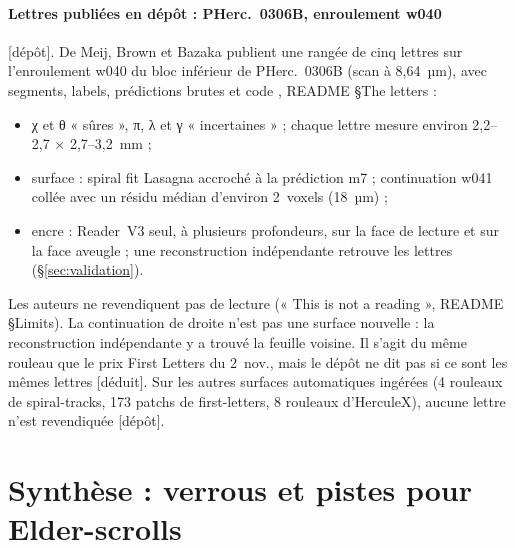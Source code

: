 \documentclass[11pt,a4paper]{article}
\newcommand{\deduit}{\textsf{\small[déduit]}}
\newcommand{\depot}{\textsf{\small[dépôt]}}
\newcommand{\pherc}[1]{PHerc.~#1}
\begin{document}
\paragraph{Lettres publiées en dépôt : \pherc{0306B}, enroulement w040} \depot. De Meij,
Brown et Bazaka publient une rangée de cinq lettres sur l'enroulement w040 du bloc inférieur
de \pherc{0306B} (scan à 8,64~µm), avec segments, labels, prédictions brutes et code
\cite{demeij2026}, README §The letters :
\begin{itemize}
  \item χ et θ « sûres », π, λ et γ « incertaines » ; chaque lettre mesure environ 2,2–2,7 ×
  2,7–3,2~mm ;
  \item surface : spiral fit Lasagna accroché à la prédiction m7 ; continuation w041 collée
  avec un résidu médian d'environ 2~voxels (18~µm) ;
  \item encre : Reader~V3 seul, à plusieurs profondeurs, sur la face de lecture et sur la face
  aveugle ; une reconstruction indépendante retrouve les lettres (§\ref{sec:validation}).
\end{itemize}
Les auteurs ne revendiquent pas de lecture (« This is not a reading », README §Limits). La
continuation de droite n'est pas une surface nouvelle : la reconstruction indépendante y a
trouvé la feuille voisine. Il s'agit du même rouleau que le prix First Letters du 2~nov., mais
le dépôt ne dit pas si ce sont les mêmes lettres \deduit. Sur les autres surfaces automatiques
ingérées (4 rouleaux de spiral-tracks, 173 patchs de first-letters, 8 rouleaux d'HerculeX),
aucune lettre n'est revendiquée \depot.

\section{Synthèse : verrous et pistes pour Elder-scrolls}
\end{document}

